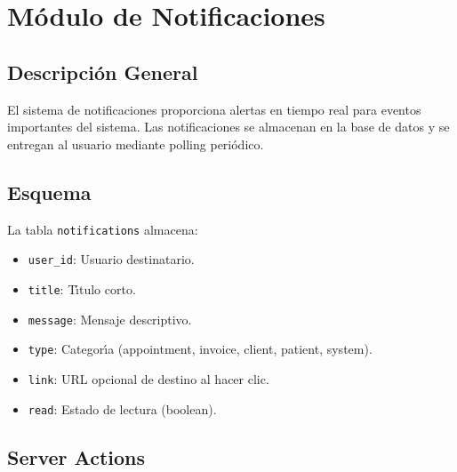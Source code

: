 \chapter{M\'odulo de Notificaciones}

\section{Descripci\'on General}

El sistema de notificaciones proporciona alertas en tiempo real para
eventos importantes del sistema. Las notificaciones se almacenan en la
base de datos y se entregan al usuario mediante polling peri\'odico.

\section{Esquema}

La tabla \texttt{notifications} almacena:

\begin{itemize}[leftmargin=*]
    \item \texttt{user\_id}: Usuario destinatario.
    \item \texttt{title}: T\'{\i}tulo corto.
    \item \texttt{message}: Mensaje descriptivo.
    \item \texttt{type}: Categor\'{\i}a (appointment, invoice, client,
          patient, system).
    \item \texttt{link}: URL opcional de destino al hacer clic.
    \item \texttt{read}: Estado de lectura (boolean).
\end{itemize}

\section{Server Actions}

